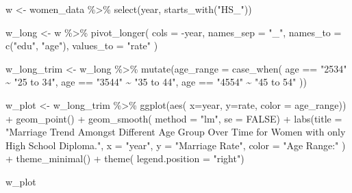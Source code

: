 \documentclass[
]{article}
\newenvironment{Shaded}{\begin{snugshade}}{\end{snugshade}}
\newcommand{\AttributeTok}[1]{\textcolor[rgb]{0.77,0.63,0.00}{#1}}
\newcommand{\ConstantTok}[1]{\textcolor[rgb]{0.00,0.00,0.00}{#1}}
\newcommand{\FunctionTok}[1]{\textcolor[rgb]{0.00,0.00,0.00}{#1}}
\newcommand{\NormalTok}[1]{#1}
\newcommand{\OtherTok}[1]{\textcolor[rgb]{0.56,0.35,0.01}{#1}}
\newcommand{\SpecialCharTok}[1]{\textcolor[rgb]{0.00,0.00,0.00}{#1}}
\newcommand{\StringTok}[1]{\textcolor[rgb]{0.31,0.60,0.02}{#1}}
\begin{document}
\begin{Shaded}
\begin{Highlighting}[]
\NormalTok{w }\OtherTok{\textless{}{-}}\NormalTok{ women\_data }\SpecialCharTok{\%\textgreater{}\%}
  \FunctionTok{select}\NormalTok{(year, }\FunctionTok{starts\_with}\NormalTok{(}\StringTok{"HS\_"}\NormalTok{)) }

\NormalTok{w\_long }\OtherTok{\textless{}{-}}\NormalTok{ w }\SpecialCharTok{\%\textgreater{}\%} \FunctionTok{pivot\_longer}\NormalTok{(}
  \AttributeTok{cols =} \SpecialCharTok{{-}}\NormalTok{year,}
  \AttributeTok{names\_sep =} \StringTok{"\_"}\NormalTok{,}
  \AttributeTok{names\_to =} \FunctionTok{c}\NormalTok{(}\StringTok{"edu"}\NormalTok{, }\StringTok{"age"}\NormalTok{),}
  \AttributeTok{values\_to =} \StringTok{"rate"}
\NormalTok{)}

\NormalTok{w\_long\_trim }\OtherTok{\textless{}{-}} 
\NormalTok{  w\_long }\SpecialCharTok{\%\textgreater{}\%} 
  \FunctionTok{mutate}\NormalTok{(}\AttributeTok{age\_range =} \FunctionTok{case\_when}\NormalTok{(}
\NormalTok{    age }\SpecialCharTok{==} \StringTok{"2534"} \SpecialCharTok{\textasciitilde{}} \StringTok{"25 to 34"}\NormalTok{,}
\NormalTok{    age }\SpecialCharTok{==} \StringTok{"3544"} \SpecialCharTok{\textasciitilde{}} \StringTok{"35 to 44"}\NormalTok{,}
\NormalTok{    age }\SpecialCharTok{==} \StringTok{"4554"} \SpecialCharTok{\textasciitilde{}} \StringTok{"45 to 54"}
\NormalTok{  ))}

\NormalTok{w\_plot }\OtherTok{\textless{}{-}}\NormalTok{ w\_long\_trim }\SpecialCharTok{\%\textgreater{}\%} 
  \FunctionTok{ggplot}\NormalTok{(}\FunctionTok{aes}\NormalTok{(}
    \AttributeTok{x=}\NormalTok{year,}
    \AttributeTok{y=}\NormalTok{rate,}
    \AttributeTok{color =}\NormalTok{ age\_range)) }\SpecialCharTok{+}
  \FunctionTok{geom\_point}\NormalTok{() }\SpecialCharTok{+}
  \FunctionTok{geom\_smooth}\NormalTok{(}
    \AttributeTok{method =} \StringTok{"lm"}\NormalTok{,}
    \AttributeTok{se =} \ConstantTok{FALSE}\NormalTok{) }\SpecialCharTok{+}
  \FunctionTok{labs}\NormalTok{(}\AttributeTok{title =} \StringTok{"Marriage Trend Amongst Different Age Group Over Time for Women with only High School Diploma."}\NormalTok{,}
    \AttributeTok{x =} \StringTok{"year"}\NormalTok{,}
    \AttributeTok{y =} \StringTok{"Marriage Rate"}\NormalTok{,}
    \AttributeTok{color =} \StringTok{"Age Range:"}
\NormalTok{  ) }\SpecialCharTok{+}
   \FunctionTok{theme\_minimal}\NormalTok{() }\SpecialCharTok{+}
  \FunctionTok{theme}\NormalTok{(}
    \AttributeTok{legend.position =} \StringTok{"right"}\NormalTok{)}

\NormalTok{w\_plot}
\end{Highlighting}
\end{Shaded}
\end{document}
